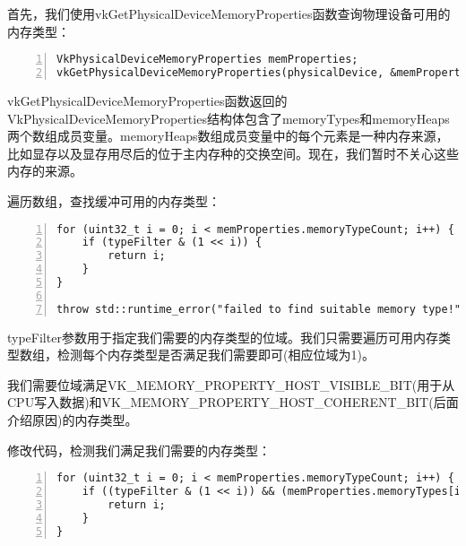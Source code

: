 \documentclass{ctexart}
\begin{document}
首先，我们使用vkGetPhysicalDeviceMemoryProperties函数查询物理设备可用的内存类型：

\begin{lstlisting}[language={[ANSI]C},keywordstyle=\color{blue!70},commentstyle=\color{red!50!green!50!blue!50},frame=shadowbox, rulesepcolor=\color{red!20!green!20!blue!20},basicstyle=\small,numbers=left, numberstyle=\tiny,breaklines=true]
VkPhysicalDeviceMemoryProperties memProperties;
vkGetPhysicalDeviceMemoryProperties(physicalDevice, &memProperties);
\end{lstlisting}

vkGetPhysicalDeviceMemoryProperties函数返回的VkPhysicalDeviceMemoryProperties结构体包含了memoryTypes和memoryHeaps两个数组成员变量。memoryHeaps数组成员变量中的每个元素是一种内存来源，比如显存以及显存用尽后的位于主内存种的交换空间。现在，我们暂时不关心这些内存的来源。

遍历数组，查找缓冲可用的内存类型：

\begin{lstlisting}[language={[ANSI]C},keywordstyle=\color{blue!70},commentstyle=\color{red!50!green!50!blue!50},frame=shadowbox, rulesepcolor=\color{red!20!green!20!blue!20},basicstyle=\small,numbers=left, numberstyle=\tiny,breaklines=true]
for (uint32_t i = 0; i < memProperties.memoryTypeCount; i++) {
	if (typeFilter & (1 << i)) {
		return i;
	}
}

throw std::runtime_error("failed to find suitable memory type!");
\end{lstlisting}

typeFilter参数用于指定我们需要的内存类型的位域。我们只需要遍历可用内存类型数组，检测每个内存类型是否满足我们需要即可(相应位域为1)。

我们需要位域满足VK\_MEMORY\_PROPERTY\_HOST\_VISIBLE\_BIT(用于从CPU写入数据)和VK\_MEMORY\_PROPERTY\_HOST\_COHERENT\_BIT(后面介绍原因)的内存类型。

修改代码，检测我们满足我们需要的内存类型：

\begin{lstlisting}[language={[ANSI]C},keywordstyle=\color{blue!70},commentstyle=\color{red!50!green!50!blue!50},frame=shadowbox, rulesepcolor=\color{red!20!green!20!blue!20},basicstyle=\small,numbers=left, numberstyle=\tiny,breaklines=true]
for (uint32_t i = 0; i < memProperties.memoryTypeCount; i++) {
	if ((typeFilter & (1 << i)) && (memProperties.memoryTypes[i].propertyFlags & properties) == properties) {
		return i;
	}
}
\end{lstlisting}
\end{document}
